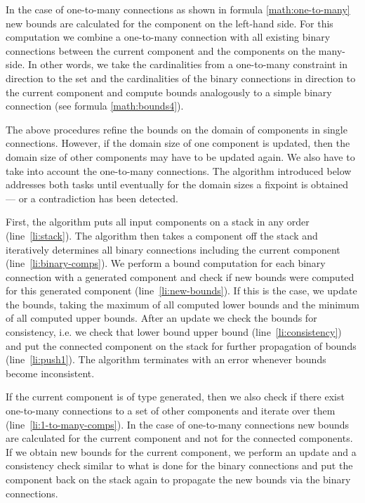 \documentclass[copyright,creativecommons]{eptcs}
\begin{document}
In the case of one-to-many connections as shown in formula \ref{math:one-to-many} new bounds are calculated for the component on the left-hand side. 
For this computation we combine a one-to-many connection with all existing binary connections between the current component and the components on the many-side. 
In other words, we take the cardinalities from a one-to-many constraint in direction to the set and the cardinalities of the binary connections in direction to the current component and compute bounds analogously to a simple binary connection (see formula \ref{math:bounds4}). 

The above procedures refine the bounds on the domain of components in single connections. 
However, if the domain size of one component is updated, then the domain size of other components may have to be updated again.
We also have to take into account the one-to-many connections. 
The algorithm introduced below addresses both tasks until eventually for the domain sizes a fixpoint is obtained --- or a contradiction has been detected.

First, the algorithm puts all input components on a stack in any order (line~\ref{li:stack}). 
The algorithm then takes a component off the stack and iteratively determines all binary connections including the current component (line~\ref{li:binary-comps}). 
We perform a bound computation for each binary connection with a generated component and check if new bounds were computed for this generated component (line~\ref{li:new-bounds}). 
If this is the case, we update the bounds, taking the maximum of all computed lower bounds and the minimum of all computed upper bounds. 
After an update we check the bounds for consistency, i.e. we check that lower bound  upper bound (line~\ref{li:consistency}) 
and put the connected component on the stack for further propagation of bounds (line~\ref{li:push1}). 
The algorithm terminates with an error whenever bounds become inconsistent. 

If the current component is of type generated, then we also check if there exist one-to-many connections to a set of other components and 
iterate over them (line~\ref{li:1-to-many-comps}). 
In the case of one-to-many connections new bounds are calculated for the current component and not for the connected components. 
If we obtain new bounds for the current component, we perform an update and a consistency check similar to what is done for the binary connections 
and put the component back on the stack again to propagate the new bounds via the binary connections. 
\end{document}
